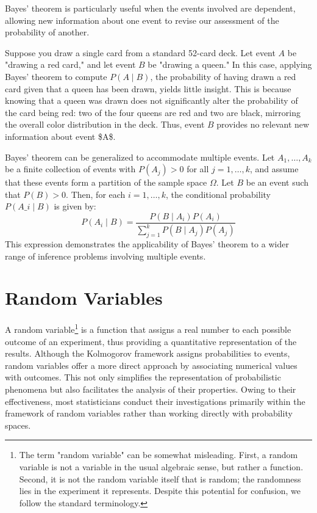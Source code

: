 Bayes' theorem is particularly useful when the events involved are dependent, allowing new information about one event to revise our assessment of the probability of another.

\begin{example}
Suppose you draw a single card from a standard 52-card deck. Let event $A$ be "drawing a red card," and let event $B$ be "drawing a queen." In this case, applying Bayes' theorem to compute $P(A \mid B)$, the probability of having drawn a red card given that a queen has been drawn, yields little insight. This is because knowing that a queen was drawn does not significantly alter the probability of the card being red: two of the four queens are red and two are black, mirroring the overall color distribution in the deck. Thus, event $B$ provides no relevant new information about event \$A\$.
\end{example}

Bayes' theorem can be generalized to accommodate multiple events. Let $A_{1}, \ldots, A_{k}$ be a finite collection of events with $P\left( A_{j} \right) > 0$ for all $j = 1, \ldots, k$, and assume that these events form a partition of the sample space $\Omega$. Let $B$ be an event such that $P\left(B\right) > 0$. Then, for each $i = 1, \ldots, k$, the conditional probability $P\left(A\_{i}\mid B\right)$ is given by:
\[
P\left(A_{i}\mid B\right)=\frac{P\left(B\mid A_{i}\right) P\left(A_{i}\right)}{\sum_{j=1}^{k} P\left(B \mid A_{j}\right) P\left(A_{j}\right)}
\]
This expression demonstrates the applicability of Bayes' theorem to a wider range of inference problems involving multiple events.

%
%

\section{Random Variables}
\label{sec:probability_random_variables}

A random variable\footnote{The term "random variable" can be somewhat misleading. First, a random variable is not a variable in the usual algebraic sense, but rather a function. Second, it is not the random variable itself that is random; the randomness lies in the experiment it represents. Despite this potential for confusion, we follow the standard terminology.} is a function that assigns a real number to each possible outcome of an experiment, thus providing a quantitative representation of the results. Although the Kolmogorov framework assigns probabilities to events, random variables offer a more direct approach by associating numerical values with outcomes. This not only simplifies the representation of probabilistic phenomena but also facilitates the analysis of their properties. Owing to their effectiveness, most statisticians conduct their investigations primarily within the framework of random variables rather than working directly with probability spaces.

